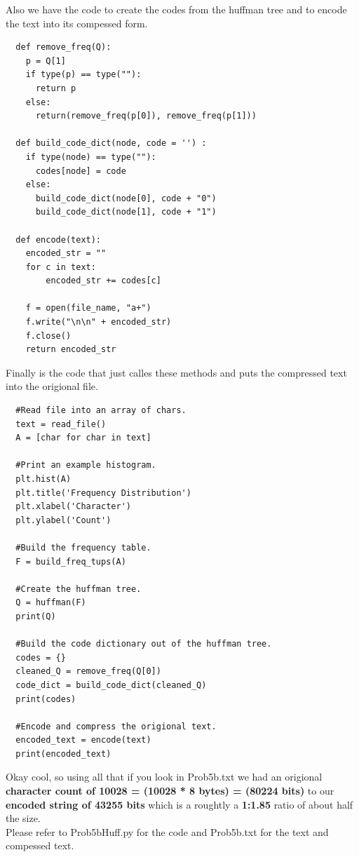 \documentclass{article}
\begin{document}
\begin{enumerate}
\begin{enumerate}
        Also we have the code to create the codes from the huffman tree and to encode the text into its compessed form.

        \begin{lstlisting}
  def remove_freq(Q):
    p = Q[1]
    if type(p) == type(""):
      return p
    else: 
      return(remove_freq(p[0]), remove_freq(p[1]))

  def build_code_dict(node, code = '') :
    if type(node) == type(""):
      codes[node] = code
    else:
      build_code_dict(node[0], code + "0")
      build_code_dict(node[1], code + "1")
        
  def encode(text):
    encoded_str = ""
    for c in text:
        encoded_str += codes[c]
        
    f = open(file_name, "a+")
    f.write("\n\n" + encoded_str)
    f.close()
    return encoded_str   
        \end{lstlisting}

        Finally is the code that just calles these methods and puts the compressed text into the origional file.

        \begin{lstlisting}
  #Read file into an array of chars.
  text = read_file()
  A = [char for char in text] 
  
  #Print an example histogram.
  plt.hist(A)
  plt.title('Frequency Distribution')
  plt.xlabel('Character')
  plt.ylabel('Count')
  
  #Build the frequency table.
  F = build_freq_tups(A)
  
  #Create the huffman tree.
  Q = huffman(F)
  print(Q)
  
  #Build the code dictionary out of the huffman tree.
  codes = {}
  cleaned_Q = remove_freq(Q[0])
  code_dict = build_code_dict(cleaned_Q)
  print(codes)
  
  #Encode and compress the origional text.
  encoded_text = encode(text)
  print(encoded_text)          
        \end{lstlisting}

        Okay cool, so using all that if you look in Prob5b.txt we had an origional \textbf{character count of 10028 = (10028 * 8 bytes) = (80224 bits)} to our \textbf{encoded string of 43255 bits} which is a roughtly a \textbf{1:1.85} ratio of about half the size.\\

        Please refer to Prob5bHuff.py for the code and Prob5b.txt for the text and compessed text.


\end{enumerate}
\end{enumerate}
\end{document}
